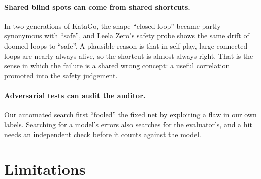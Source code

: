 \documentclass[11pt]{article}
\begin{document}
\paragraph{Shared blind spots can come from shared shortcuts.} In two generations of KataGo, the shape ``closed loop'' became partly synonymous with ``safe'', and Leela Zero's safety probe shows the same drift of doomed loops to ``safe''. A plausible reason is that in self-play, large connected loops are nearly always alive, so the shortcut is almost always right. That is the sense in which the failure is a shared wrong concept: a useful correlation promoted into the safety judgement.

\paragraph{Adversarial tests can audit the auditor.} Our automated search first ``fooled'' the fixed net by exploiting a flaw in our own labels. Searching for a model's errors also searches for the evaluator's, and a hit needs an independent check before it counts against the model.

\section{Limitations}
\label{sec:limits}
\end{document}
